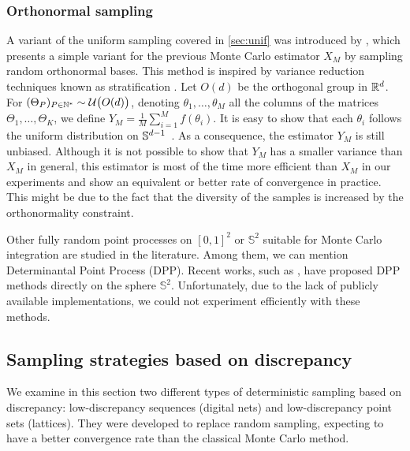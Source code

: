 \subsubsection{Orthonormal sampling} \label{ortho}

{A variant of the uniform sampling covered in \autoref{sec:unif} was introduced by \citep{rowland2019orthogonal}, which presents a simple variant for the previous Monte Carlo estimator $X_M$ by sampling random orthonormal bases. This method is inspired by variance reduction techniques known as stratification \citep{lemieux2009monte}.
Let $O(d)$ be the orthogonal group in $\mathbb{R}^d$. For $(\Theta_P)_{P\in \mathbb{N}^*} \sim \mathcal{U}\big(O(d)\big)$, denoting $\theta_1,\hdots,\theta_M$ all the columns of the matrices $\Theta_1,\hdots,\Theta_K$, we define $Y_M =\displaystyle\frac{1}{M}\sum\limits_{i = 1}^{M} f(\theta_i)$. It is easy to show that each $\theta_i$ follows the uniform distribution on $\mathbb{S}^{d-1}$~\citep{rowland2019orthogonal}. As a consequence, the estimator $Y_M$ is still unbiased. Although it is not possible to show that $Y_M$ has a smaller variance than $X_M$ in general, this estimator is most of the time more efficient than $X_M$ in our experiments and show an equivalent or better rate of convergence in practice. This might be due to the fact that the diversity of the samples is increased by the orthonormality constraint.}

\begin{Rk}
 Other fully random point processes on $[0,1]^2$ or $\mathbb{S}^2$ suitable for Monte Carlo integration are studied in the literature. Among them, we can mention Determinantal Point Process (DPP). Recent works, such as \citep{feng2023determinantalpointprocessesspheres}, have proposed DPP methods directly on the sphere $\mathbb{S}^2$. Unfortunately, due to the lack of publicly available implementations, we could not experiment efficiently with these methods.
\end{Rk}


\subsection{Sampling strategies based on discrepancy}

We examine in this section two different types of deterministic sampling based on discrepancy: low-discrepancy sequences (digital nets) and low-discrepancy point sets (lattices). They were developed to replace random sampling, expecting to have a better convergence rate than the classical Monte Carlo method. 

